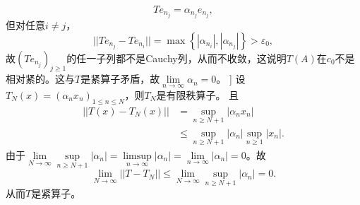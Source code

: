 \begin{enumerate}
\begin{answer}[]
      \[Te_{n_j}=\alpha_{n_j}e_{n_j},\]
      但对任意$i\not= j$，
      \[||Te_{n_j}-Te_{n_i}||=\max\left\{|\alpha_{n_i}|,|\alpha_{n_j}|\right\}> \varepsilon_0,\]
      故$(Te_{n_j})_{j\geqslant1}$的任一子列都不是Cauchy列，从而不收敛，这说明$T(A)$在$c_0$不是相对紧的。这与$T$是紧算子矛盾，故$\lim\limits_{n\rightarrow \infty}\alpha_n=0$。 ]
      设$T_N(x)=(\alpha_n x_n)_{1\leqslant n\leqslant N}$，则$T_N$是有限秩算子。
      且
      \[\begin{aligned}
        ||T(x)-T_N(x)||&=\sup_{n\geqslant N+1}|\alpha_n x_n|\\ 
                      &\leqslant \sup_{n\geqslant N+1}|\alpha_n| \sup_{n\geqslant 1}|x_n|.
      \end{aligned}\]
      由于$\lim\limits_{N\rightarrow \infty} \sup\limits_{n\geqslant N+1}|\alpha_n|=\limsup\limits_{n\rightarrow \infty}|\alpha_n|=\lim\limits_{n\rightarrow \infty}|\alpha_n|=0$。故
      \[\lim\limits_{N\rightarrow \infty}||T-T_N||\leqslant  \lim\limits_{N\rightarrow \infty}\sup_{n\geqslant N+1}|\alpha_n|=0.\]
      从而$T$是紧算子。
    \end{answer}
\end{enumerate}

